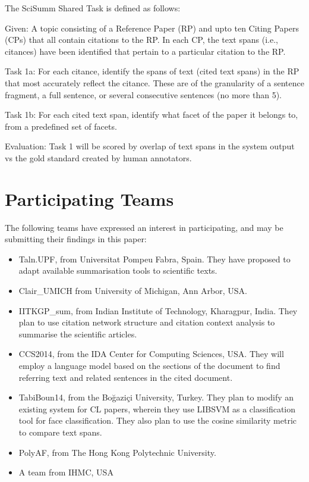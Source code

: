\documentclass[11pt]{article}
\begin{document}
The SciSumm Shared Task is defined as follows:

Given: A topic consisting of a Reference Paper (RP) and upto ten Citing Papers (CPs) that all contain citations to the RP. In each CP, the text spans (i.e., citances) have been identified that pertain to a particular citation to the RP.

Task 1a: For each citance, identify the spans of text (cited text spans) in the RP that most accurately reflect the citance. These are of the granularity of a sentence fragment, a full sentence, or several consecutive sentences (no more than 5).

Task 1b: For each cited text span, identify what facet of the paper it belongs to, from a predefined set of facets.

Evaluation: Task 1 will be scored by overlap of text spans in the system output vs the gold standard created by human annotators.  

\section{Participating Teams}
The following teams have expressed an interest in participating, and may be submitting their findings in this paper: 
\begin{itemize}
\item{Taln.UPF, from Universitat Pompeu Fabra, Spain. They have proposed to adapt available summarisation tools to scientific texts.}
\item{Clair_UMICH from University of Michigan, Ann Arbor, USA.}
\item{IITKGP_sum, from Indian Institute of Technology, Kharagpur, India. They plan to use citation network structure and citation context analysis to summarise the scientific articles.}
\item{CCS2014, from the IDA Center for Computing Sciences, USA. They will employ a language model based on the sections of the document to find referring text and related sentences in the cited document.}
\item{TabiBoun14, from the Boğaziçi University, Turkey. They plan to modify an existing system for CL papers, wherein they use LIBSVM as a classification tool for face classification. They also plan to use the cosine similarity metric to compare text spans.}
\item {PolyAF, from The Hong Kong Polytechnic University.}
\item {A team from IHMC, USA}
\end{itemize}
\end{document}
